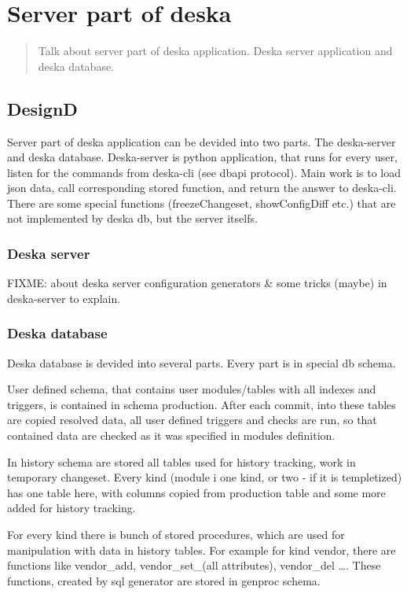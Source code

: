 \documentclass[deska]{subfiles}
\begin{document}
\chapter{Server part of deska}
\label{sec:deska-server}

\begin{abstract}
Talk about server part of deska application. Deska server application and deska database.
\end{abstract}

\section{DesignD}
Server part of deska application can be devided into two parts. The deska-server and deska database.
Deska-server is python application, that runs for every user, listen for the commands from deska-cli (see dbapi protocol).
Main work is to load json data, call corresponding stored function, and return the answer to deska-cli.
There are some special functions (freezeChangeset, showConfigDiff etc.) that are not implemented by deska db, but the server itselfs.

\subsection{Deska server}
FIXME: about deska server configuration generators & some tricks (maybe) in deska-server to explain.

\subsection{Deska database}
Deska database is devided into several parts. Every part is in special db schema. 

User defined schema, that contains user modules/tables with all indexes and triggers, is contained in schema production. After each commit, into these tables are copied resolved data, all user defined triggers and checks are run, so that contained data are checked as it was specified in modules definition.

In history schema are stored all tables used for history tracking, work in temporary changeset. Every kind (module i one kind, or two - if it is templetized) has one table here, with columns copied from production table and some more added for history tracking.

For every kind there is bunch of stored procedures, which are used for manipulation with data in history tables. For example for kind vendor, there are functions like vendor\_add, vendor\_set\_(all attributes), vendor\_del ….
These functions, created by sql generator are stored in genproc schema.
\end{document}
